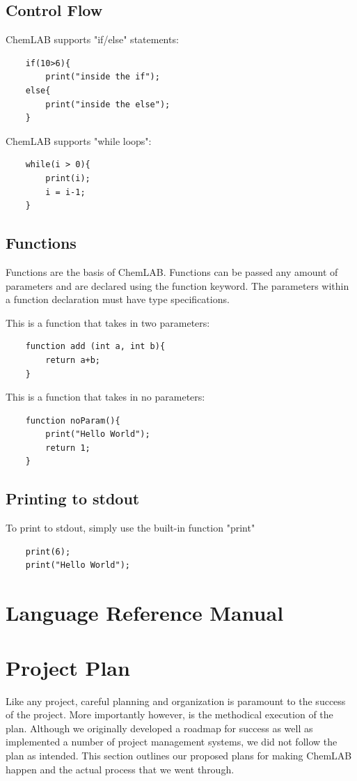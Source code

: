 \documentclass[11pt]{report}
\begin{document}
\section{Control Flow}
ChemLAB supports "if/else" statements: 
	\begin{verbatim}
	if(10>6){
		print("inside the if");
	else{
		print("inside the else");
	}
	\end{verbatim}
	
ChemLAB supports "while loops": 
	\begin{verbatim}
	while(i > 0){
		print(i);
		i = i-1;
	}
	\end{verbatim}
	
\section{Functions}
Functions are the basis of ChemLAB. Functions can be passed any amount of parameters and are declared using the function keyword. The parameters within a function declaration must have type specifications. 

This is a function that takes in two parameters:
	\begin{verbatim}
	function add (int a, int b){
		return a+b;
	}
	\end{verbatim}
	
This is a function that takes in no parameters:
	\begin{verbatim}
	function noParam(){
		print("Hello World");
		return 1;
	}
	\end{verbatim}

\section{Printing to stdout}

To print to stdout, simply use the built-in function "print" 
\begin{verbatim}
	print(6);
	print("Hello World");
\end{verbatim}

\chapter{Language Reference Manual}
\chapter{Project Plan}
Like any project, careful planning and organization is paramount to the success of the project. More importantly however, is the methodical execution of the plan. Although we originally developed a roadmap for success as well as implemented a number of project management systems, we did not follow the plan as intended. This section outlines our proposed plans for making ChemLAB happen and the actual process that we went through. 
\end{document}
